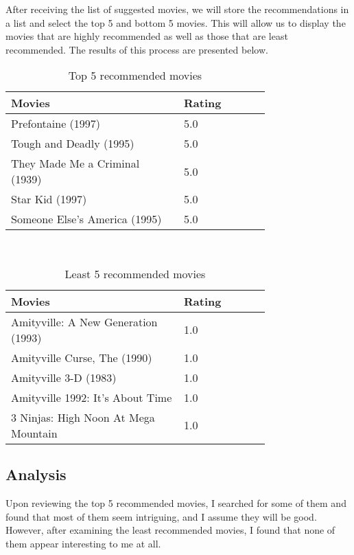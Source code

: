 \documentclass[12pt]{article}
\begin{document}
After receiving the list of suggested movies, we will store the recommendations in a list and select the top 5 and bottom 5 movies. This will allow us to display the movies that are highly recommended as well as those that are least recommended. The results of this process are presented below.
\\
\begin{table}[h]
\centering
\caption{Top 5 recommended movies}
\label{tbl:simple}
\begin{tabular}{p{0.50\linewidth}p{0.25\linewidth}}
\hline
\textbf{Movies} & \textbf{Rating} \\ \hline \hline
Prefontaine (1997) & 5.0 \\ \hline
Tough and Deadly (1995) & 5.0 \\ \hline
They Made Me a Criminal (1939) & 5.0 \\ \hline
Star Kid (1997) & 5.0 \\ \hline
Someone Else's America (1995) & 5.0 \\ \hline
\hline
\end{tabular}
\end{table}
\\
\begin{table}[h]
\centering
\caption{Least 5 recommended movies}
\label{tbl:simple}
\begin{tabular}{p{0.50\linewidth}p{0.25\linewidth}}
\hline
\textbf{Movies} & \textbf{Rating} \\ \hline \hline
Amityville: A New Generation (1993) & 1.0 \\ \hline
Amityville Curse, The (1990) & 1.0 \\ \hline
Amityville 3-D (1983) & 1.0 \\ \hline
Amityville 1992: It's About Time & 1.0 \\ \hline
3 Ninjas: High Noon At Mega Mountain & 1.0 \\ \hline
\hline
\end{tabular}
\end{table}
\subsection*{Analysis}
\begin{itemize}
    Upon reviewing the top 5 recommended movies, I searched for some of them and found that most of them seem intriguing, and I assume they will be good. However, after examining the least recommended movies, I found that none of them appear interesting to me at all.
\end{itemize}
\end{document}
